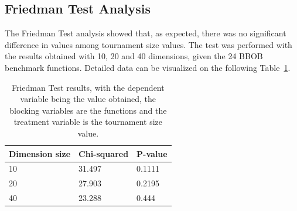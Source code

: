 \subsection{Friedman Test Analysis}
The Friedman Test analysis showed that, as expected, there was no significant difference in values among tournament size values. The test was performed with the results obtained with 10, 20 and 40 dimensions, given the 24 BBOB benchmark functions. Detailed data can be visualized on the following Table~\ref{Friedman_test}. 

\vspace{3mm}
\begin{table}[!ht]
	\centering
	\label{Friedman_test}
	\begin{tabular}{|l|l|l|}
		\hline
		Dimension size      & Chi-squared        & P-value                     \\ \hline
		\multicolumn{1}{|l|}{10} & \multicolumn{1}{l|}{31.497} & \multicolumn{1}{l|}{0.1111} \\ \hline
		\multicolumn{1}{|l|}{20} & \multicolumn{1}{l|}{27.903} & \multicolumn{1}{l|}{0.2195} \\ \hline
		\multicolumn{1}{|l|}{40} & \multicolumn{1}{l|}{23.288} & \multicolumn{1}{l|}{0.444}  \\ \hline
	\end{tabular}
	\caption{Friedman Test results, with the dependent variable being the value obtained, the blocking variables are the functions and the treatment variable is the tournament size value.}

\end{table}